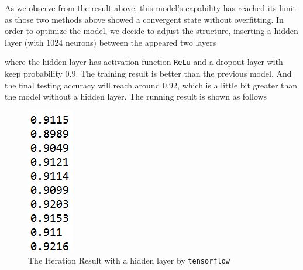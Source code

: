 \documentclass[10pt]{article}
\begin{document}
As we observe from the result above, this model's capability has reached its limit as those two methods above showed a convergent state without overfitting. In order to optimize the model, we decide to adjust the structure, inserting a hidden layer (with $1024$ neurons) between the appeared two layers
\begin{figure}[H]
\centering
{}
\end{figure}
where the hidden layer has activation function \texttt{ReLu} and a dropout layer with keep probability $0.9$. The training result is better than the previous model. And the final testing accuracy will reach around $0.92$, which is a little bit greater than the model without a hidden layer. The running result is shown as follows
\begin{figure}[H]
\centering
\includegraphics[scale=0.9]{fig4.png}
\caption{The Iteration Result with a hidden layer by \texttt{tensorflow}}
\label{fig3}
\end{figure}
\end{document}
